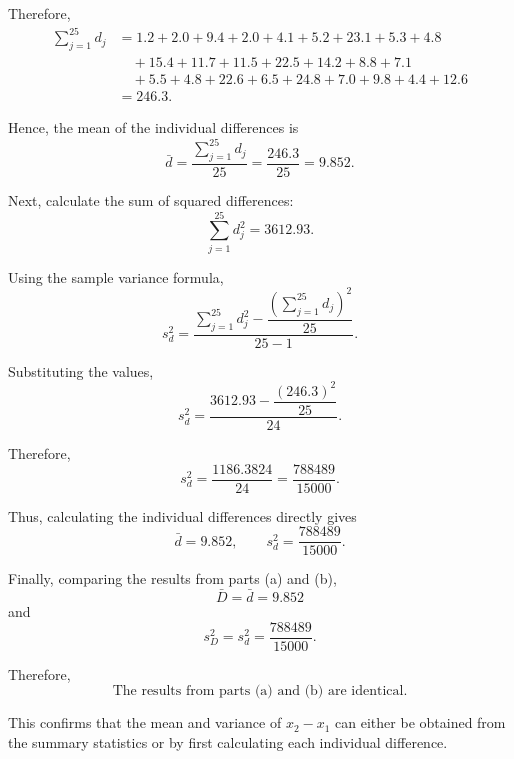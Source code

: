 \documentclass[12pt]{article}
\begin{document}
	Therefore,
	\[
	\begin{aligned}
		\sum_{j=1}^{25}d_j
		&=
		1.2+2.0+9.4+2.0+4.1+5.2+23.1+5.3+4.8\\
		&\quad+15.4+11.7+11.5+22.5+14.2+8.8+7.1\\
		&\quad+5.5+4.8+22.6+6.5+24.8+7.0+9.8+4.4+12.6\\
		&=246.3.
	\end{aligned}
	\]
	
	Hence, the mean of the individual differences is
	\[
	\bar{d}
	=
	\frac{\sum_{j=1}^{25}d_j}{25}
	=
	\frac{246.3}{25}
	=
	\boxed{9.852}.
	\]
	
	Next, calculate the sum of squared differences:
	\[
	\sum_{j=1}^{25}d_j^2
	=
	3612.93.
	\]
	
	Using the sample variance formula,
	\[
	s_d^2
	=
	\frac{
		\sum_{j=1}^{25}d_j^2
		-
		\dfrac{\left(\sum_{j=1}^{25}d_j\right)^2}{25}
	}{25-1}.
	\]
	
	Substituting the values,
	\[
	s_d^2
	=
	\frac{
		3612.93-\dfrac{(246.3)^2}{25}
	}{24}.
	\]
	
	Therefore,
	\[
	s_d^2
	=
	\frac{1186.3824}{24}
	=
	\boxed{\frac{788489}{15000}}.
	\]
	
	Thus, calculating the individual differences directly gives
	\[
	\boxed{
		\bar{d}=9.852,
		\qquad
		s_d^2=\frac{788489}{15000}}.
	\]
	
	Finally, comparing the results from parts (a) and (b),
	\[
	\bar{D}=\bar{d}=9.852
	\]
	and
	\[
	s_D^2=s_d^2
	=
	\frac{788489}{15000}.
	\]
	
	Therefore,
	\[
	\boxed{
		\text{The results from parts (a) and (b) are identical.}}
	\]
	
	This confirms that the mean and variance of \(x_2-x_1\)
	can either be obtained from the summary statistics or by
	first calculating each individual difference.
	
\end{document}
